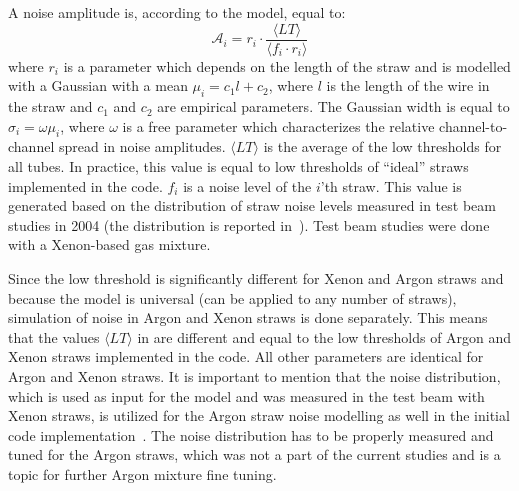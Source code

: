 

A noise amplitude is, according to the model, equal to:
\begin{equation}
 \mathcal A_{i} = r_{i} \cdot \dfrac{\langle LT \rangle}{\langle f_i \cdot r_i \rangle}
 \label{eq:ampl_noise}
\end{equation}
where $r_{i}$ is a parameter which depends on the length of the straw and is modelled with a Gaussian with a mean $\mu_i = c_1 l + c_2$, 
where $l$ is the length of the wire in the straw and $c_1$ and $c_2$ are empirical parameters.
The Gaussian width is equal to $\sigma_i = \omega \mu_i$, where $\omega$ is a free parameter which characterizes the
relative channel-to-channel spread in noise amplitudes.
$\langle LT \rangle$ is the average of the low thresholds for all tubes. In practice, this value is equal to low thresholds of ``ideal'' straws 
implemented in the code.
$f_{i}$ is a noise level of the $i$'th straw. This value is generated based on the distribution of straw noise levels measured in test beam studies in 2004 
(the distribution is reported in~\cite{kittelmann_thesis}).
Test beam studies were done with a Xenon-based gas mixture. 

Since the low threshold is significantly different for Xenon and Argon straws and because the model is universal (can be applied to any number of straws), 
simulation of noise in Argon and Xenon straws is done separately. This means that the values $\langle LT \rangle$ in  are 
different and equal to the low thresholds of Argon and Xenon straws implemented in the code. All other parameters are identical for Argon and Xenon straws.
It is important to mention that the noise distribution, which is used as input for the model and was measured in the test beam with Xenon straws,
is utilized for the Argon straw noise modelling as well in the initial code implementation~\cite{anatoli_private_communication}. 
The noise distribution has to be properly measured and tuned for the Argon straws, which
was not a part of the current studies and is a topic for further Argon mixture fine tuning.

